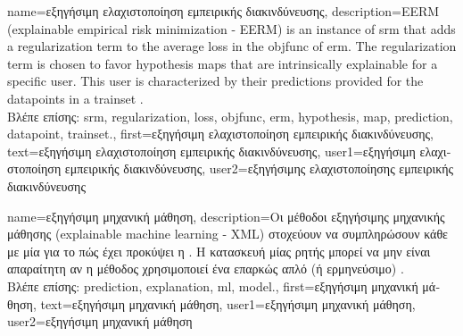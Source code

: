 {name={\foreignlanguage{greek}{εξηγήσιμη ελαχιστοποίηση εμπειρικής διακινδύνευσης}}, 
	description={EERM (explainable empirical risk minimization - EERM) is 
		an 
		instance of \gls{srm} that adds a \gls{regularization} term to the average \gls{loss} in the \gls{objfunc} of \gls{erm}. 
		The \gls{regularization} term is chosen to favor \gls{hypothesis} \gls{map}s that are intrinsically 
		explainable for a specific user. This user is characterized by their \gls{prediction}s provided 
		for the \gls{datapoint}s in a \gls{trainset} \cite{Zhang:2024aa}.\\
		\foreignlanguage{greek}{Βλέπε επίσης:} \gls{srm}, \gls{regularization}, \gls{loss}, \gls{objfunc}, \gls{erm}, \gls{hypothesis}, 
		\gls{map}, \gls{prediction}, \gls{datapoint}, \gls{trainset}.},
	first={\foreignlanguage{greek}{εξηγήσιμη ελαχιστοποίηση εμπειρικής διακινδύνευσης}}, 
	text={\foreignlanguage{greek}{εξηγήσιμη ελαχιστοποίηση εμπειρικής διακινδύνευσης}},
	user1={\foreignlanguage{greek}{εξηγήσιμη ελαχιστοποίηση εμπειρικής διακινδύνευσης}}, %
  	user2={\foreignlanguage{greek}{εξηγήσιμης ελαχιστοποίησης εμπειρικής διακινδύνευσης}} %
}

{name={\foreignlanguage{greek}{εξηγήσιμη μηχανική μάθηση}}, 
	description={\foreignlanguage{greek}{Οι μέθοδοι εξηγήσιμης μηχανικής 
		μάθησης} (explainable machine learning - XML)
		\foreignlanguage{greek}{στοχεύουν να συμπληρώσουν κάθε}  \foreignlanguage{greek}{με μία} 
		 \foreignlanguage{greek}{για το πώς έχει προκύψει η} . 
		\foreignlanguage{greek}{Η κατασκευή μίας ρητής}  \foreignlanguage{greek}{μπορεί να 
		μην είναι απαραίτητη αν η μέθοδος}  \foreignlanguage{greek}{χρησιμοποιεί ένα επαρκώς απλό 
		(ή ερμηνεύ\-σιμο})  \cite{rudin2019stop}.\\
		\foreignlanguage{greek}{Βλέπε επίσης:} \gls{prediction}, \gls{explanation}, \gls{ml}, \gls{model}.},
	first={\foreignlanguage{greek}{εξηγήσιμη μηχανική μάθηση}},
	text={\foreignlanguage{greek}{εξηγήσιμη μηχανική μάθηση}},
	user1={\foreignlanguage{greek}{εξηγήσιμη μηχανική μάθηση}}, %
  	user2={\foreignlanguage{greek}{εξηγήσιμη μηχανική μάθηση}} %
}

